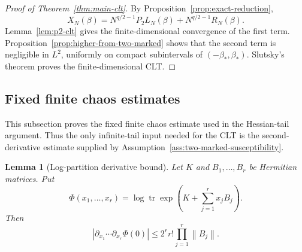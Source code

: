 \documentclass[11pt]{article}
\newtheorem{lemma}[theorem]{Lemma}
\newcommand{\tr}{\operatorname{tr}}
\newcommand{\norm}[1]{\left\lVert #1\right\rVert}
\begin{document}
\begin{proof}[Proof of Theorem~\ref{thm:main-clt}]
  By Proposition~\ref{prop:exact-reduction},
  \begin{equation}\label{eq:Xn-decomposition}
    X_N(\beta)
    =
    N^{q/2-1}P_2L_N(\beta)
    +
    N^{q/2-1}R_N(\beta).
  \end{equation}
  Lemma~\ref{lem:p2-clt} gives the finite-dimensional convergence of the first
  term.  Proposition~\ref{prop:higher-from-two-marked} shows that the second
  term is negligible in $L^2$, uniformly on compact subintervals of
  $(-\beta_*,\beta_*)$.  Slutsky's theorem proves the finite-dimensional CLT.
\end{proof}

\subsection{Fixed finite chaos estimates}

This subsection proves the fixed finite chaos estimate used in the Hessian-tail
argument.  Thus the only infinite-tail input needed for the CLT is the
second-derivative estimate supplied by
Assumption~\ref{ass:two-marked-susceptibility}.

\begin{lemma}[Log-partition derivative bound]
  \label{lem:log-partition-derivative-bound}
  Let $K$ and $B_1,\ldots,B_r$ be Hermitian matrices.  Put
  \begin{equation}\label{eq:logZ-general}
    \Phi(x_1,\ldots,x_r)
    =
    \log\tr\exp\left(K+\sum_{j=1}^r x_jB_j\right).
  \end{equation}
  Then
  \begin{equation}\label{eq:log-partition-derivative-bound}
    \left|
      \partial_{x_1}\cdots\partial_{x_r}\Phi(0)
    \right|
    \leq
    2^r r!\prod_{j=1}^r\norm{B_j}.
  \end{equation}
\end{lemma}
\end{document}
